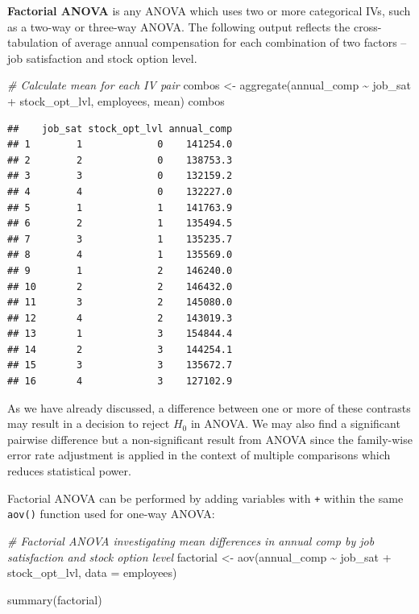 \documentclass[
]{book}
\newenvironment{Shaded}{\begin{snugshade}}{\end{snugshade}}
\newcommand{\AttributeTok}[1]{\textcolor[rgb]{0.77,0.63,0.00}{#1}}
\newcommand{\CommentTok}[1]{\textcolor[rgb]{0.56,0.35,0.01}{\textit{#1}}}
\newcommand{\FunctionTok}[1]{\textcolor[rgb]{0.00,0.00,0.00}{#1}}
\newcommand{\NormalTok}[1]{#1}
\newcommand{\OtherTok}[1]{\textcolor[rgb]{0.56,0.35,0.01}{#1}}
\newcommand{\SpecialCharTok}[1]{\textcolor[rgb]{0.00,0.00,0.00}{#1}}
\begin{document}
\textbf{Factorial ANOVA} is any ANOVA which uses two or more categorical IVs, such as a two-way or three-way ANOVA. The following output reflects the cross-tabulation of average annual compensation for each combination of two factors -- job satisfaction and stock option level.

\begin{Shaded}
\begin{Highlighting}[]
\CommentTok{\# Calculate mean for each IV pair}
\NormalTok{combos }\OtherTok{\textless{}{-}} \FunctionTok{aggregate}\NormalTok{(annual\_comp }\SpecialCharTok{\textasciitilde{}}\NormalTok{ job\_sat }\SpecialCharTok{+}\NormalTok{ stock\_opt\_lvl, employees, mean)}
\NormalTok{combos}
\end{Highlighting}
\end{Shaded}

\begin{verbatim}
##    job_sat stock_opt_lvl annual_comp
## 1        1             0    141254.0
## 2        2             0    138753.3
## 3        3             0    132159.2
## 4        4             0    132227.0
## 5        1             1    141763.9
## 6        2             1    135494.5
## 7        3             1    135235.7
## 8        4             1    135569.0
## 9        1             2    146240.0
## 10       2             2    146432.0
## 11       3             2    145080.0
## 12       4             2    143019.3
## 13       1             3    154844.4
## 14       2             3    144254.1
## 15       3             3    135672.7
## 16       4             3    127102.9
\end{verbatim}

As we have already discussed, a difference between one or more of these contrasts may result in a decision to reject \(H_0\) in ANOVA. We may also find a significant pairwise difference but a non-significant result from ANOVA since the family-wise error rate adjustment is applied in the context of multiple comparisons which reduces statistical power.

Factorial ANOVA can be performed by adding variables with \texttt{+} within the same \texttt{aov()} function used for one-way ANOVA:

\begin{Shaded}
\begin{Highlighting}[]
\CommentTok{\# Factorial ANOVA investigating mean differences in annual comp by job satisfaction and stock option level}
\NormalTok{factorial }\OtherTok{\textless{}{-}} \FunctionTok{aov}\NormalTok{(annual\_comp }\SpecialCharTok{\textasciitilde{}}\NormalTok{ job\_sat }\SpecialCharTok{+}\NormalTok{ stock\_opt\_lvl, }\AttributeTok{data =}\NormalTok{ employees)}

\FunctionTok{summary}\NormalTok{(factorial)}
\end{Highlighting}
\end{Shaded}
\end{document}
